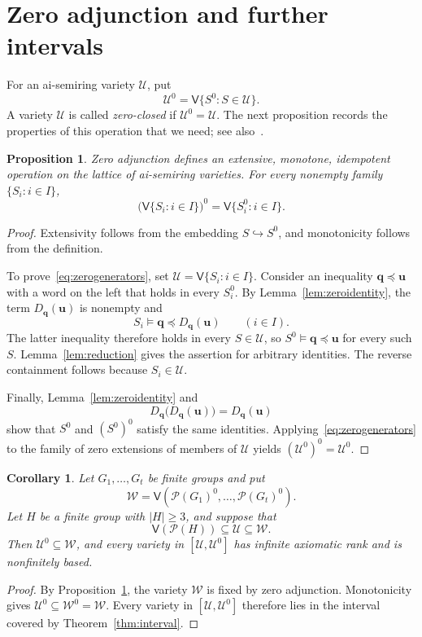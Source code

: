 \documentclass[10pt,a4paper]{amsart}
\newtheorem{corollary}[theorem]{Corollary}
\newtheorem{proposition}[theorem]{Proposition}
\numberwithin{equation}{section}
\newcommand{\Pow}{\mathcal{P}}
\newcommand{\Full}[1]{\mathcal{P}(#1)^0}
\newcommand{\Var}{\mathsf{V}}
\newcommand{\bu}{\mathbf{u}}
\newcommand{\bq}{\mathbf{q}}
\newcommand{\calU}{\mathcal{U}}
\newcommand{\calW}{\mathcal{W}}
\renewcommand{\geq}{\geqslant}
\begin{document}
\section{Zero adjunction and further intervals}\label{sec:extensions}
For an ai-semiring variety $\calU$, put
\[
 \calU^0=\Var\{S^0:S\in\calU\}.
\]
A variety $\calU$ is called \emph{zero-closed} if $\calU^0=\calU$.
The next proposition records the properties of this operation that we need; see also~\cite[Corollaries~2.2 and~2.3]{grz}.

\begin{proposition}\label{prop:zerooperator}
Zero adjunction defines an extensive, monotone, idempotent operation on the lattice of ai-semiring varieties. For every nonempty family $\{S_i:i\in I\}$,
\begin{equation}\label{eq:zerogenerators}
 \bigl(\Var\{S_i:i\in I\}\bigr)^0
 =\Var\{S_i^0:i\in I\}.
\end{equation}
\end{proposition}
\begin{proof}
Extensivity follows from the embedding $S\hookrightarrow S^0$, and monotonicity follows from the definition.

To prove~\eqref{eq:zerogenerators}, set $\calU=\Var\{S_i:i\in I\}$. Consider an inequality $\bq\preceq\bu$ with a word on the left that holds in every $S_i^0$. By Lemma~\ref{lem:zeroidentity}, the term $D_{\bq}(\bu)$ is nonempty and
\[
 S_i\models\bq\preceq D_{\bq}(\bu)\qquad(i\in I).
\]
The latter inequality therefore holds in every $S\in\calU$, so $S^0\models\bq\preceq\bu$ for every such $S$. Lemma~\ref{lem:reduction} gives the assertion for arbitrary identities. The reverse containment follows because $S_i\in\calU$.

Finally, Lemma~\ref{lem:zeroidentity} and
\[
 D_{\bq}\bigl(D_{\bq}(\bu)\bigr)=D_{\bq}(\bu)
\]
show that $S^0$ and $(S^0)^0$ satisfy the same identities. Applying~\eqref{eq:zerogenerators} to the family of zero extensions of members of $\calU$ yields $(\calU^0)^0=\calU^0$.
\end{proof}

\begin{corollary}\label{cor:generalzero}
Let $G_1,\ldots,G_t$ be finite groups and put
\[
 \calW=\Var(\Full{G_1},\ldots,\Full{G_t}).
\]
Let $H$ be a finite group with $|H|\geq 3$, and suppose that
\[
 \Var(\Pow(H))\subseteq\calU\subseteq\calW.
\]
Then $\calU^0\subseteq\calW$, and every variety in $[\calU,\calU^0]$ has infinite axiomatic rank and is nonfinitely based.
\end{corollary}
\begin{proof}
By Proposition~\ref{prop:zerooperator}, the variety $\calW$ is fixed by zero adjunction. Monotonicity gives $\calU^0\subseteq\calW^0=\calW$. Every variety in $[\calU,\calU^0]$ therefore lies in the interval covered by Theorem~\ref{thm:interval}.
\end{proof}
\end{document}
